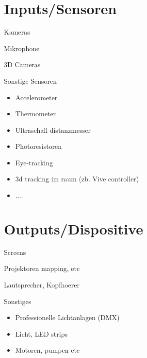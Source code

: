 \section{Inputs/Sensoren}
 \frame{\sectionpage}

\begin{frame}{Kameras}

\end{frame}


\begin{frame}{Mikrophone}

\end{frame}

\begin{frame}{3D Cameras}

\end{frame}

\begin{frame}{Sonstige Sensoren}

\begin{itemize}
\item Accelerometer
\item Thermometer
\item Ultraschall distanzmesser
\item Photoresistoren
\item Eye-tracking
\item 3d tracking im raum (zb. Vive controller)
\item ....

\end{itemize}

\end{frame}

\section{Outputs/Dispositive}
 \frame{\sectionpage}

\begin{frame}{Screens}

\end{frame}


\begin{frame}{Projektoren}
mapping, etc

\end{frame}


\begin{frame}{Lautsprecher, Kopfhoerer}

\end{frame}

\begin{frame}{Sonstiges}
\begin{itemize}
	\item Professionelle Lichtanlagen (DMX)
	\item Licht, LED strips
	\item Motoren, pumpen etc

\end{itemize}

\end{frame}



